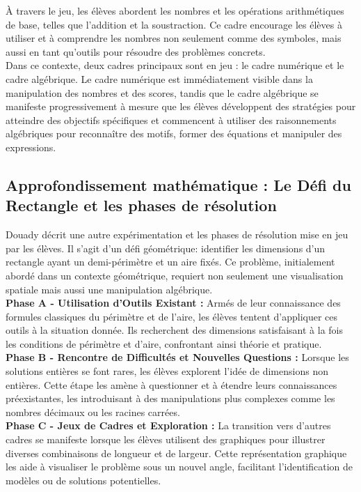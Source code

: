 À travers le jeu,
les élèves abordent les nombres et les opérations arithmétiques de base,
telles que l'addition et la soustraction.
Ce cadre encourage les élèves à utiliser et à comprendre les nombres non seulement comme des symboles,
mais aussi en tant qu'outils pour résoudre des problèmes concrets.\\

Dans ce contexte,
deux cadres principaux sont en jeu :
le cadre numérique et le cadre algébrique.
Le cadre numérique est immédiatement visible dans la manipulation des nombres et des scores,
tandis que le cadre algébrique se manifeste progressivement à mesure que les élèves développent des stratégies pour atteindre des objectifs spécifiques et commencent à utiliser des raisonnements algébriques pour reconnaître des motifs,
former des équations et manipuler des expressions.

\subsection{Approfondissement mathématique : Le Défi du Rectangle et les phases de résolution}

Douady décrit une autre expérimentation et les phases de résolution mise en jeu par les élèves.
Il s'agit d'un défi géométrique:
identifier les dimensions d'un rectangle ayant un demi-périmètre et un aire fixés.
Ce problème,
initialement abordé dans un contexte géométrique,
requiert non seulement une visualisation spatiale mais aussi une manipulation algébrique.\\

\textbf{Phase A - Utilisation d'Outils Existant :}
Armés de leur connaissance des formules classiques du périmètre et de l'aire,
les élèves tentent d'appliquer ces outils à la situation donnée.
Ils recherchent des dimensions satisfaisant à la fois les conditions de périmètre et d'aire,
confrontant ainsi théorie et pratique.\\

\textbf{Phase B - Rencontre de Difficultés et Nouvelles Questions :}
Lorsque les solutions entières se font rares,
les élèves explorent l'idée de dimensions non entières.
Cette étape les amène à questionner et à étendre leurs connaissances préexistantes,
les introduisant à des manipulations plus complexes comme les nombres décimaux ou les racines carrées.\\

\textbf{Phase C - Jeux de Cadres et Exploration :}
La transition vers d'autres cadres se manifeste lorsque les élèves utilisent des graphiques pour illustrer diverses combinaisons de longueur et de largeur.
Cette représentation graphique les aide à visualiser le problème sous un nouvel angle,
facilitant l'identification de modèles ou de solutions potentielles.\\

